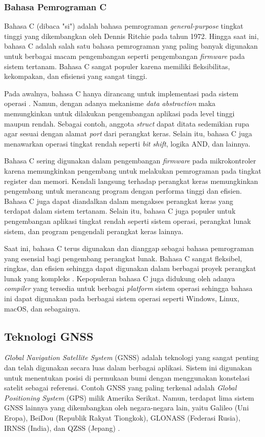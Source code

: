 \subsubsection{Bahasa Pemrograman C}
Bahasa C (dibaca "si") adalah bahasa pemrograman \textit{general-purpose} tingkat tinggi yang dikembangkan oleh Dennis Ritchie pada tahun 1972. Hingga saat ini, bahasa C adalah salah satu bahasa pemrograman yang paling banyak digunakan \cite{SO2022} untuk berbagai macam pengembangan seperti pengembangan \textit{firmware} pada sistem tertanam. Bahasa C sangat populer karena memiliki fleksibilitas, kekompakan, dan efisiensi yang sangat tinggi.

Pada awalnya, bahasa C hanya dirancang untuk implementasi pada sistem operasi \cite{Ritchie1993}. Namun, dengan adanya mekanisme \textit{data abstraction} maka memungkinkan untuk dilakukan pengembangan aplikasi pada level tinggi maupun rendah. Sebagai contoh, anggota \textit{struct} dapat ditata sedemikian rupa agar sesuai dengan alamat \textit{port} dari perangkat keras. Selain itu, bahasa C juga menawarkan operasi tingkat rendah seperti \textit{bit shift}, logika AND, dan lainnya.

Bahasa C sering digunakan dalam pengembangan \textit{firmware} pada mikrokontroler karena memungkinkan pengembang untuk melakukan pemrograman pada tingkat register dan memori. Kendali langsung terhadap perangkat keras memungkinkan pengembang untuk merancang program dengan performa tinggi dan efisien. Bahasa C juga dapat diandalkan dalam mengakses perangkat keras yang terdapat dalam sistem tertanam. Selain itu, bahasa C juga populer untuk pengembangan aplikasi tingkat rendah seperti sistem operasi, perangkat lunak sistem, dan program pengendali perangkat keras lainnya.

Saat ini, bahasa C terus digunakan dan dianggap sebagai bahasa pemrograman yang esensial bagi pengembang perangkat lunak. Bahasa C sangat fleksibel, ringkas, dan efisien sehingga dapat digunakan dalam berbagai proyek perangkat lunak yang kompleks \cite{Deitel2016}. Kepopuleran bahasa C juga didukung oleh adanya \textit{compiler} yang tersedia untuk berbagai \textit{platform} sistem operasi sehingga bahasa ini dapat digunakan pada berbagai sistem operasi seperti Windows, Linux, macOS, dan sebagainya.

\subsection{Teknologi GNSS}
\textit{Global Navigation Satellite System} (GNSS) adalah teknologi yang sangat penting dan telah digunakan secara luas dalam berbagai aplikasi. Sistem ini digunakan untuk menentukan posisi di permukaan bumi dengan menggunakan konstelasi satelit sebagai referensi. Contoh GNSS yang paling terkenal adalah \textit{Global Positioning System} (GPS) milik Amerika Serikat. Namun, terdapat lima sistem GNSS lainnya yang dikembangkan oleh negara-negara lain, yaitu Galileo (Uni Eropa), BeiDou (Republik Rakyat Tiongkok), GLONASS (Federasi Rusia), IRNSS (India), dan QZSS (Jepang) \cite{NationalCoordinationOfficeforSpace-BasedPositioning2021}.

